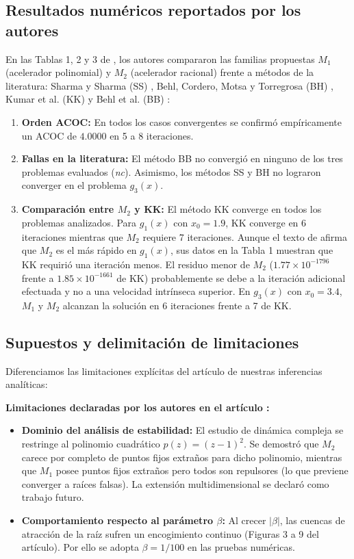 \documentclass[10pt, a4paper]{article}
\begin{document}
\subsection{Resultados numéricos reportados por los autores}
En las Tablas 1, 2 y 3 de \cite{Jerezano2026}, los autores compararon las familias propuestas $M_1$ (acelerador polinomial) y $M_2$ (acelerador racional) frente a métodos de la literatura: Sharma y Sharma (SS) \cite{Sharma2010}, Behl, Cordero, Motsa y Torregrosa (BH) \cite{Behl2016}, Kumar et al. (KK) \cite{Kumar2020b} y Behl et al. (BB) \cite{Behl2021a}:
\begin{enumerate}
    \item \textbf{Orden ACOC:} En todos los casos convergentes se confirmó empíricamente un ACOC de $4.0000$ en 5 a 8 iteraciones.
    \item \textbf{Fallas en la literatura:} El método BB no convergió en ninguno de los tres problemas evaluados (\textit{nc}). Asimismo, los métodos SS y BH no lograron converger en el problema $g_3(x)$.
    \item \textbf{Comparación entre $M_2$ y KK:} El método KK converge en todos los problemas analizados. Para $g_1(x)$ con $x_0 = 1.9$, KK converge en 6 iteraciones mientras que $M_2$ requiere 7 iteraciones. Aunque el texto de \cite{Jerezano2026} afirma que $M_2$ es el más rápido en $g_1(x)$, sus datos en la Tabla 1 muestran que KK requirió una iteración menos. El residuo menor de $M_2$ ($1.77 \times 10^{-1796}$ frente a $1.85 \times 10^{-1661}$ de KK) probablemente se debe a la iteración adicional efectuada y no a una velocidad intrínseca superior. En $g_3(x)$ con $x_0 = 3.4$, $M_1$ y $M_2$ alcanzan la solución en 6 iteraciones frente a 7 de KK.
\end{enumerate}

\subsection{Supuestos y delimitación de limitaciones}
Diferenciamos las limitaciones explícitas del artículo de nuestras inferencias analíticas:

\textbf{Limitaciones declaradas por los autores en el artículo \cite{Jerezano2026}:}
\begin{itemize}
    \item \textbf{Dominio del análisis de estabilidad:} El estudio de dinámica compleja se restringe al polinomio cuadrático $p(z) = (z-1)^2$. Se demostró que $M_2$ carece por completo de puntos fijos extraños para dicho polinomio, mientras que $M_1$ posee puntos fijos extraños pero todos son repulsores (lo que previene converger a raíces falsas). La extensión multidimensional se declaró como trabajo futuro.
    \item \textbf{Comportamiento respecto al parámetro $\beta$:} Al crecer $|\beta|$, las cuencas de atracción de la raíz sufren un encogimiento continuo (Figuras 3 a 9 del artículo). Por ello se adopta $\beta = 1/100$ en las pruebas numéricas.
\end{itemize}
\end{document}
